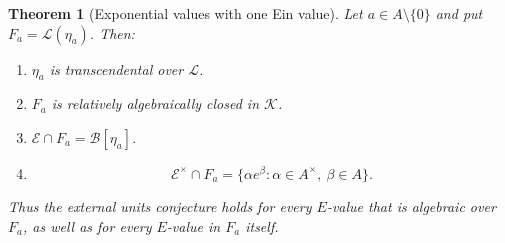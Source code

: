 \documentclass[11pt,a4paper]{article}
\numberwithin{equation}{section}
\newtheorem{theorem}{Theorem}[section]
\theoremstyle{definition}
\theoremstyle{remark}
\begin{document}
\begin{theorem}[Exponential values with one Ein value]
\label{ev:one-Ein-field}
Let $a\in A\setminus\{0\}$ and put $F_a=\mathcal L(\eta_a)$.
Then:
\begin{enumerate}
\item $\eta_a$ is transcendental over $\mathcal L$.
\item $F_a$ is relatively algebraically closed in $\mathcal K$.
\item $\mathcal E\cap F_a=\mathcal B[\eta_a]$.
\item
\[
 \mathcal E^\times\cap F_a
 =\{\alpha e^\beta:\alpha\in A^\times,\ \beta\in A\}.
\]
\end{enumerate}
Thus the external units conjecture holds for every $E$-value that is
algebraic over $F_a$, as well as for every $E$-value in $F_a$ itself.
\end{theorem}
\end{document}
